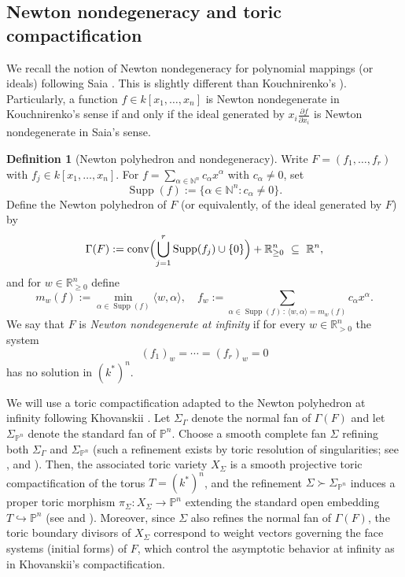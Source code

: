 \documentclass[12pt]{amsart}
\newcommand{\kk}{k}
\newcommand{\NN}{\mathbb{N}}
\newcommand{\RR}{\mathbb{R}}
\newcommand{\PP}{\mathbb{P}}
\newcommand{\Supp}{\operatorname{\mathrm{Supp}}}
\theoremstyle{plain}
\theoremstyle{definition}
\newtheorem{definition}[theorem]{Definition}
\numberwithin{equation}{section}
\begin{document}
\subsection{Newton nondegeneracy and toric compactification}

We recall the notion of Newton nondegeneracy for polynomial mappings (or ideals) following Saia \cite{Saia}. This is slightly different than Kouchnirenko's \cite{Kou76}). Particularly, a function $f \in \kk[x_1, \dots, x_n]$ is Newton nondegenerate in Kouchnirenko's sense if and only if the ideal generated by $x_i\frac{\partial f}{\partial x_i}$ is Newton nondegenerate in Saia's sense.

\begin{definition}[Newton polyhedron and nondegeneracy]\label{def:newton-infty}
	Write $F=(f_1,\dots,f_r)$ with $f_j\in \kk[x_1,\dots,x_n]$.
	For $f=\sum_{\alpha\in\NN^n} c_\alpha x^\alpha$ with $c_\alpha\neq 0$, set
	\[
	\Supp(f):=\{\alpha\in\NN^n: c_\alpha\neq 0\}.
	\]
	Define the Newton polyhedron of $F$ (or equivalently, of the ideal generated by $F$) by
	\[
	\Gamma(F):=\mathrm{conv}\Bigl(\bigcup_{j=1}^r\Supp(f_j)\cup\{0\}\Bigr)+\RR_{\ge 0}^n
	\ \subseteq\ \RR^n,
	\]
	and for $w\in\RR_{\ge 0}^n$ define
	\[
	m_w(f):=\min_{\alpha\in\Supp(f)}\langle w,\alpha\rangle,\quad
	f_w:=\sum_{\alpha\in\Supp(f)\,:\,\langle w,\alpha\rangle=m_w(f)} c_\alpha x^\alpha.
	\]
	We say that $F$ is \emph{Newton nondegenerate at infinity} if for every $w\in\RR_{>0}^n$ the system
	\[
	(f_1)_w=\cdots=(f_r)_w=0
	\]
	has no solution in $(\kk^*)^n$.
\end{definition}

We will use a toric compactification adapted to the Newton polyhedron at infinity following Khovanskii \cite{Khovanskii}.  Let $\Sigma_{\Gamma}$ denote the normal fan of $\Gamma(F)$ and let $\Sigma_{\PP^n}$ denote the standard fan of $\PP^n$.  Choose a smooth complete fan $\Sigma$ refining both $\Sigma_{\Gamma}$
and $\Sigma_{\PP^n}$ (such a refinement exists by toric resolution of singularities;
see \cite{Khovanskii,Oka}, \cite[Chapter 11]{CLS} and \cite[Chapter 2]{Fulton}).  Then, the associated toric variety $X_\Sigma$ is a smooth projective toric compactification of the torus $T=(\kk^*)^n$, and the refinement
$\Sigma\succ \Sigma_{\PP^n}$ induces a proper toric morphism $\pi_\Sigma:X_\Sigma\longrightarrow \PP^n$
extending the standard open embedding $T\hookrightarrow \PP^n$ (see \cite[Chapter 3]{CLS} and \cite[Chapters 1--2]{Fulton}).  Moreover, since
$\Sigma$ also refines the normal fan of $\Gamma(F)$, the toric boundary divisors of
$X_\Sigma$ correspond to weight vectors governing the face systems (initial forms)
of $F$, which control the asymptotic behavior at infinity as in Khovanskii's
compactification.
\end{document}

